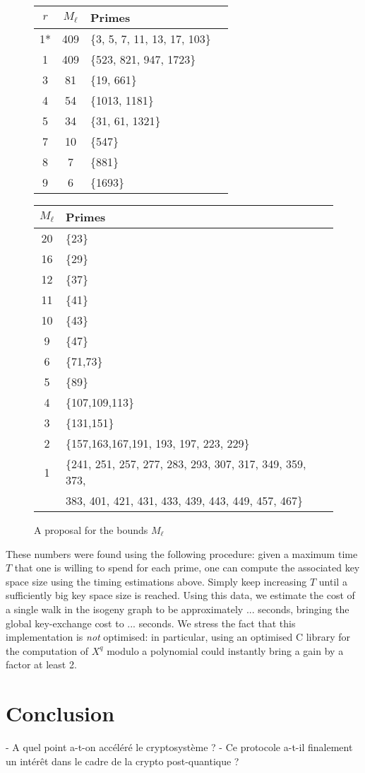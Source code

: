 \documentclass{article}
\theoremstyle{definition}
\begin{document}
\begin{figure}
\centering
\begin{tabular}{cclc}
$r$ & $M_\ell$ & Primes \\
\hline
1* & 409 & \{3, 5, 7, 11, 13, 17, 103\} \\
1 & 409 & \{523, 821, 947, 1723\} \\
3 & 81 & \{19, 661\} \\
4 & 54 & \{1013, 1181\} \\
5 & 34 & \{31, 61, 1321\} \\
7 & 10 & \{547\} \\
8 & 7 & \{881\} \\
9 & 6 & \{1693\}
\end{tabular}
\vfill
\begin{tabular}{cl}
$M_\ell$ & Primes \\
\hline
20 & \{23\} \\
16 & \{29\} \\
12 & \{37\} \\
11 & \{41\} \\
10 & \{43\} \\
9 & \{47\} \\
6 & \{71,73\} \\
5 & \{89\} \\
4 & \{107,109,113\} \\
3 & \{131,151\} \\
2 & \{157,163,167,191,
  193,
  197,
  223,
  229\} \\
1 & \{241,
  251,
  257,
  277,
  283,
  293,
  307,
  317,
  349,
  359,
  373,
	\\ &
  383,
  401,
  421,
  431,
  433,
  439,
  443,
  449,
  457,
  467\} \\
\end{tabular}
\caption{\label{fig:steps} A proposal for the bounds $M_\ell$}
\end{figure}

These numbers were found using the following procedure: given a maximum time
$T$ that one is willing to spend for each prime, one can compute the
associated key space size using the timing estimations above. Simply keep
increasing $T$ until a sufficiently big key space size is reached.
Using this data, we estimate the cost of a single walk in the
isogeny graph to be approximately ... seconds, bringing the global
key-exchange cost to ... seconds. We stress the fact that this implementation
is \emph{not} optimised: in particular, using an optimised C library
for the computation of $X^q$ modulo a polynomial could instantly bring a
gain by a factor at least 2.


\section{Conclusion}

- A quel point a-t-on accéléré le cryptosystème ?
- Ce protocole a-t-il finalement un intérêt dans le cadre de la crypto post-quantique ?




\end{document}

